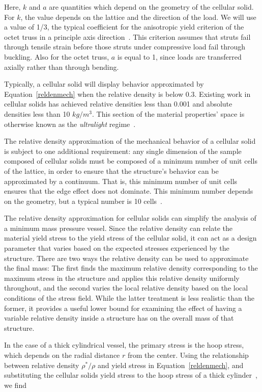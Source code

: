 \documentclass[twocolumn,letterpaper]{IEEEAerospaceCLS}  %
\begin{document}
Here, $k$ and $a$ are quantities which depend on the geometry of the cellular solid. For $k$, the value depends on the lattice and the direction of the load. We will use a value of 1/3, the typical coefficient for the anisotropic yield criterion of the octet truss in a principle axis direction~\cite{deshpande2001effective}. This criterion assumes that struts fail through tensile strain before those struts under compressive load fail through buckling. Also for the octet truss, $a$ is equal to 1, since loads are transferred axially rather than through bending. 

Typically, a cellular solid will display behavior approximated by Equation~\ref{reldenmech} when the relative density is below 0.3. Existing work in cellular solids has achieved relative densities less than 0.001 and absolute densities less than 10 $kg/m^3$. This section of the material properties' space is otherwise known as the \emph{ultralight} regime~\cite{zheng2014ultralight}.

The relative density approximation of the mechanical behavior of a cellular solid is subject to one additional requirement: any single dimension of the sample composed of cellular solids must be composed of a minimum number of unit cells of the lattice, in order to ensure that the structure's behavior can be approximated by a continuum. That is, this minimum number of unit cells ensures that the edge effect does not dominate. This minimum number depends on the geometry, but a typical number is 10 cells~\cite{cheung2013reversibly}.
	
The relative density approximation for cellular solids can simplify the analysis of a minimum mass pressure vessel. Since the relative density can relate the material yield stress to the yield stress of the cellular solid, it can act as a design parameter that varies based on the expected stresses experienced by the structure. There are two ways the relative density can be used to approximate the final mass: The first finds the maximum relative density corresponding to the maximum stress in the structure and applies this relative density uniformly throughout, and the second varies the local relative density based on the local conditions of the stress field. While the latter treatment is less realistic than the former, it provides a useful lower bound for examining the effect of having a variable relative density inside a structure has on the overall mass of that structure.

In the case of a thick cylindrical vessel, the primary stress is the hoop stress, which depends on the radial distance $r$ from the center. Using the relationship between relative density $\rho^*/\rho$ and yield stress in Equation~\ref{reldenmech}, and substituting the cellular solids yield stress to the hoop stress of a thick cylinder~\cite{young2002roark}, we find
\end{document}
